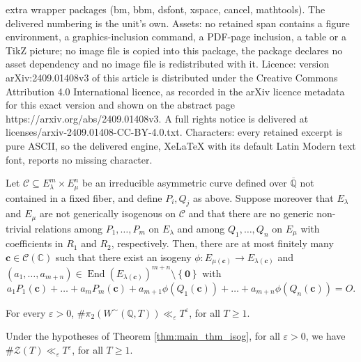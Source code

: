 \documentclass[10pt,a4paper]{amsart}
\DeclareMathOperator{\en}{End}
\newcommand{\C}{\mathbb{C}}
\newcommand{\Qal}{\overline{\mathbb{Q}}}
\newcommand{\Q}{\mathbb{Q}}
\newcommand{\cc}{\mathbf{c}}
\newcommand{\eps}{\varepsilon}
\newcommand{\m}{\mu}
\newcommand{\pg}[1]{\left\lbrace #1 \right\rbrace}
\newcommand{\pt}[1]{\left( #1 \right)}
\renewcommand{\c}{\mathcal{C}}
\renewcommand{\l}{\lambda}
\begin{document}
extra wrapper packages (bm, bbm, dsfont, xspace, cancel, mathtools). The delivered numbering is the unit's own. Assets: no retained span contains a figure environment, a graphics-inclusion command, a PDF-page inclusion, a table or a TikZ picture; no image file is copied into this package, the package declares no asset dependency and no image file is redistributed with it. Licence: version arXiv:2409.01408v3 of this article is distributed under the Creative Commons Attribution 4.0 International licence, as recorded in the arXiv licence metadata for this exact version and shown on the abstract page https://arxiv.org/abs/2409.01408v3. A full rights notice is delivered at licenses/arxiv-2409.01408-CC-BY-4.0.txt. Characters: every retained excerpt is pure ASCII, so the delivered engine, XeLaTeX with its default Latin Modern text font, reports no missing character.
\begin{theorem}\label{thm:main_thm_isog}
Let $\c \subseteq E_{\l}^m \times E_{\m}^n$ be an irreducible asymmetric curve defined over $\Qal$ not contained in a fixed fiber, and define $P_i, Q_j$ as above.
Suppose moreover that $E_{\l}$ and $E_{\m}$ are not generically isogenous on $\c$ and that there are no generic non-trivial relations among $P_1, \ldots, P_m$ on $E_{\l}$ and among $Q_1, \ldots, Q_n$ on $E_{\m}$ with coefficients in $R_1$ and $R_2$, respectively. Then, there are at most finitely many $\cc \in \c (\C)$ such that there exist an isogeny $\phi: E_{\m(\cc)} \rightarrow E_{\l(\cc)}$ and $(a_1, \ldots, a_{m+n}) \in \en(E_{\l(\cc)})^{m+n}\setminus \pg{\mathbf{0}}$ with $$a_1 P_1(\cc)+ \ldots +a_m P_m(\cc)+ a_{m+1} \phi \pt{Q_1(\cc)}+ \ldots + a_{m+n} \phi \pt{Q_n(\cc)}=O.$$
\end{theorem}

\begin{lemma}\label{lemma:bound_ll_Teps_isog}
For every $\eps>0$, $\# \pi_2\pt{W^{\sim}(\Q,T)}\ll_{\eps} T^{\eps}$, for all $T\geq 1$.
\end{lemma}

\begin{proposition}\label{prop:main_estim_isog}
Under the hypotheses of Theorem \ref{thm:main_thm_isog}, for all $\eps>0$, we have $\# \mathcal{Z}(T)\ll_{\eps} T^{\eps}$, for all $T\geq 1$.
\end{proposition}
\end{document}
